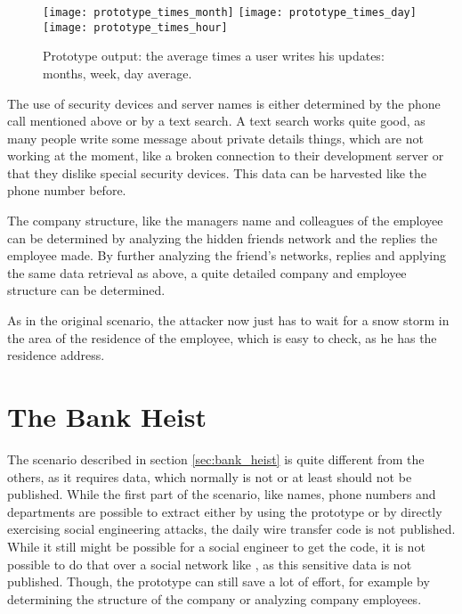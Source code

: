 \begin{figure}[htb]
  \begin{center}
    \texttt{[image: prototype\_times\_month]} 
    \texttt{[image: prototype\_times\_day]} 
    \texttt{[image: prototype\_times\_hour]}
    \caption{Prototype output: the average times a user writes his updates: months,
    week, day average.}
    \label{fig:prototype_times}
  \end{center}
\end{figure}

The use of security devices and server names is either determined by the phone
call mentioned above or by a text search. A text search works quite good, as
many people write some message about private details things, which are not
working at the moment, like a broken connection to their development server or
that they dislike special security devices. This data can be harvested like the
phone number before.

The company structure, like the managers name and colleagues of the employee
can be determined by analyzing the hidden friends network and the replies the
employee made. By further analyzing the friend's networks, replies and applying
the same data retrieval as above, a quite detailed company and employee
structure can be determined.

As in the original scenario, the attacker now just has to wait for a snow storm
in the area of the residence of the employee, which is easy to check, as he
has the residence address.

\section{The Bank Heist}

The scenario described in section \ref{sec:bank_heist} is quite different from
the others, as it requires data, which normally is not or at least should not
be published. While the first part of the scenario, like names, phone numbers
and departments are possible to extract either by using the prototype or by
directly exercising social engineering attacks, the daily wire transfer code is not
published. While it still might be possible for a social engineer to get the
code, it is not possible to do that over a social network like \Twitter{}, as
this sensitive data is not published. Though, the prototype can still save a
lot of effort, for example by determining the structure of the company or
analyzing company employees.


